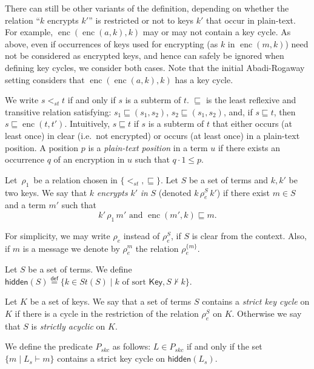 \documentclass[acmtocl,acmnow]{acmtrans2m}
\newcommand{\set}[1]{\lbrace{#1}\rbrace}
\newcommand{\st}{\mathit{St}}
\newcommand{\HK}{K}
\newcommand{\penc}[2]{\operatorname{enc}(#1,#2)}
\newcommand{\enc}{\operatorname{enc}}
\newcommand{\keys}{\mathsf{Key}}
\newcommand{\eqdef}{\stackrel{\mathsf{def}}{=}}
\newcommand{\rhoun}{\,\rho_1\,}
\newcommand{\lset}[1]{#1_s}
\newcommand{\hidden}[1]{\mathsf{hidden}({#1})}
\newcommand{\sacyclic}{strictly acyclic}
\begin{document}
There can still be other variants of the definition,
depending on whether  the relation ``$k$ encrypts $k'$'' is restricted or not to keys $k'$ that occur in
plain-text. For example, $\enc(\enc(a,k),k)$ may or may not contain a key cycle. As above, even if
occurrences of keys used for encrypting (as $k$ in $\penc{m}{k}$) need not be considered as encrypted keys,
and hence can safely be ignored when defining key cycles, we consider both cases. Note that the
initial Abadi-Rogaway setting considers that $\enc(\enc(a,k),k)$ has a key cycle.


We write $s<_{st} t$ if and only if $s$ is a subterm of $t$.
$\sqsubseteq$ is the least reflexive and transitive relation
satisfying: $s_1\sqsubseteq
(s_1,s_2)$, $s_2\sqsubseteq (s_1,s_2)$, and, if $s\sqsubseteq t$,
 then $s\sqsubseteq \penc{t}{t'}$.
Intuitively, $s\sqsubseteq t$ if $s$ is a subterm of $t$ that either
occurs (at least once) in clear (i.e.~not encrypted) or occurs (at
least once) in a plain-text position.  A position $p$ is a
\emph{plain-text position} in a term $u$ if there exists an occurrence
$q$ of an encryption in $u$ such that $q\cdot 1\le p$.

\begin{definition}
Let $\rhoun$ be a relation chosen in
$\{<_{st},\sqsubseteq\}$. Let $S$ be a set of terms and $k, k'$ be two keys. We say that
$k$ \emph{encrypts} $k'$ \emph{in} $S$ (denoted $k\, \rho_e^S\, k'$) if there exist
$m\in S$ and a term $m'$ such that $$k'\rhoun m'\mbox{ and } \enc(m',k)\sqsubseteq m.$$
\end{definition}
For simplicity, we may write $\rho_e$ instead of $\rho_e^S$, if $S$ is
clear from the context.  Also, if $m$ is a message we denote by
$\rho_e^m$ the relation $\rho_e^{\{m\}}$.





Let $S$ be a set of terms. We define $\hidden{S}\!\eqdef\!\set{k\in\st(S)\mid k\mbox{ of sort }\keys,
S\not\vdash k}$.

\begin{definition}\label{def:skc}
Let $\HK$ be a set of keys. We say that a set of terms $S$ contains a \emph{strict key
cycle} on $K$ if there is a cycle in the restriction of the relation $\rho_e^S$ on $K$. Otherwise we say that
$S$ is \emph{\sacyclic} on $K$.

We define the predicate $P_{skc}$ as follows:
$L\in P_{skc}$ if and only if
the set $\set{m\mid \lset{L}\vdash m}$ contains a strict key cycle on $\hidden{\lset{L}}$.
\end{definition}
\end{document}
